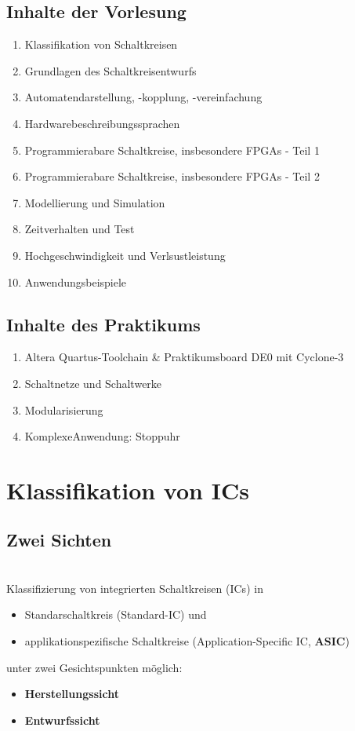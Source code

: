 \subsection{Inhalte der Vorlesung}
	\begin{enumerate}
		\item Klassifikation von Schaltkreisen
		\item Grundlagen des Schaltkreisentwurfs
		\item Automatendarstellung, -kopplung, -vereinfachung
		\item Hardwarebeschreibungssprachen
		\item Programmierabare Schaltkreise, insbesondere FPGAs - Teil 1
		\item Programmierabare Schaltkreise, insbesondere FPGAs - Teil 2
		\item Modellierung und Simulation
		\item Zeitverhalten und Test
		\item Hochgeschwindigkeit und Verlsustleistung
		\item Anwendungsbeispiele
	\end{enumerate}

\subsection{Inhalte des Praktikums}
	\begin{enumerate}
		\item Altera Quartus-Toolchain \& Praktikumsboard DE0 mit Cyclone-3
		\item Schaltnetze und Schaltwerke
		\item Modularisierung
		\item \grqq Komplexe\grqq Anwendung: Stoppuhr
	\end{enumerate}


\section{Klassifikation von ICs}

\subsection{Zwei Sichten}
	\hfill\\Klassifizierung von integrierten Schaltkreisen (ICs) in
	\begin{itemize}
		\item Standarschaltkreis (Standard-IC) und
		\item applikationspezifische Schaltkreise (Application-Specific IC, \textbf{ASIC})
	\end{itemize}
	unter zwei Gesichtspunkten möglich:
	\begin{itemize}
		\item \textbf{Herstellungssicht}
		\item \textbf{Entwurfssicht}
	\end{itemize}

